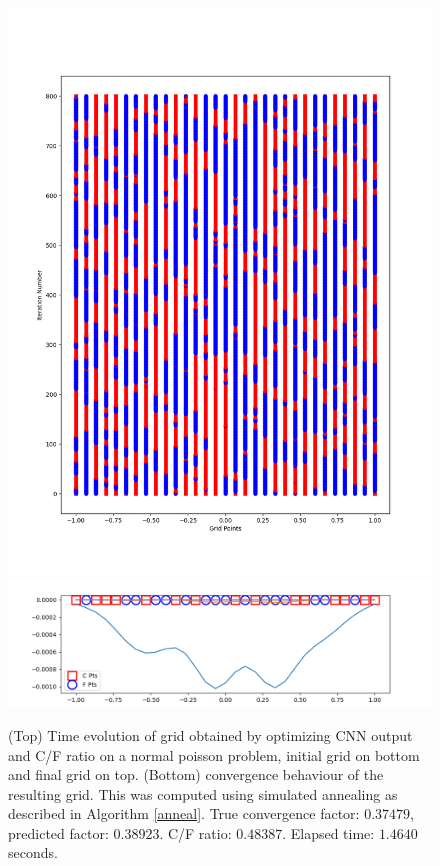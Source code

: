 \begin{figure}[h]
  \centering
  \includegraphics[scale=0.5]{figures/grid-opt/poisson_unitary_grid_time.png}
  \includegraphics[scale=0.5]{figures/grid-opt/poisson_unitary_grid_conv.png}
  \caption{(Top) Time evolution of grid obtained by optimizing CNN output and C/F ratio on a normal poisson problem, initial grid on bottom and final grid on top.  (Bottom) convergence behaviour of the resulting grid.  This was computed using simulated annealing as described in Algorithm \ref{anneal}.  True convergence factor: $0.37479$, predicted factor: $0.38923$.  C/F ratio: $0.48387$.  Elapsed time: $1.4640$ seconds.  }
  \label{fig:optimized_grid_poisson}
\end{figure}

